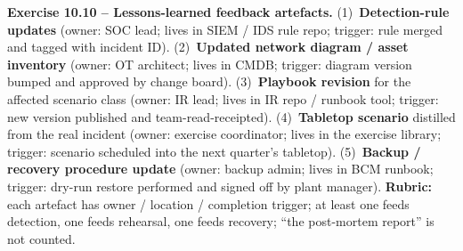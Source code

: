 \documentclass[11pt,a4paper]{article}
\begin{document}
\begin{solutionbox}
\textbf{Exercise 10.10 -- Lessons-learned feedback artefacts.}
(1)~\textbf{Detection-rule updates} (owner: SOC lead; lives in SIEM / IDS
rule repo; trigger: rule merged and tagged with incident ID).
(2)~\textbf{Updated network diagram / asset inventory} (owner: OT
architect; lives in CMDB; trigger: diagram version bumped and approved by
change board). (3)~\textbf{Playbook revision} for the affected scenario
class (owner: IR lead; lives in IR repo / runbook tool; trigger: new
version published and team-read-receipted). (4)~\textbf{Tabletop scenario}
distilled from the real incident (owner: exercise coordinator; lives in
the exercise library; trigger: scenario scheduled into the next
quarter's tabletop). (5)~\textbf{Backup / recovery procedure update}
(owner: backup admin; lives in BCM runbook; trigger: dry-run restore
performed and signed off by plant manager). \textbf{Rubric:} each
artefact has owner / location / completion trigger; at least one feeds
detection, one feeds rehearsal, one feeds recovery; ``the post-mortem
report'' is not counted.
\end{solutionbox}
\end{document}
